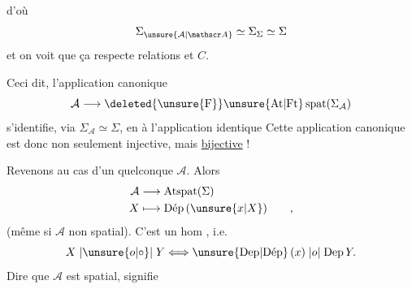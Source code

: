 d'où
\[
\Sigma_{\unsure{\mathcal A|\mathscr A}}\simeq\Sigma_{\Sigma}\simeq\Sigma
\]
et on voit que ça respecte relations  et $C$.

Ceci dit, l'application canonique
\[
\mathcal A\longrightarrow\deleted{\unsure{\mathrm F}}\unsure{\mathrm{At}|\mathrm{Ft}}\,\mathrm{spat}(\Sigma_{\mathcal A})
\]
s'identifie, via $\Sigma_{\mathcal A}\simeq\Sigma$, en 
à l'application identique Cette application canonique est donc non seulement injective, mais \uline{bijective} !

Revenons au cas d'un   quelconque $\mathcal A$.  Alors 
\[
\begin{aligned}
\mathcal A&\longrightarrow\mathrm{Atspat}(\Sigma)\\
X&\longmapsto\text{Dép}\,(\unsure{x|X})\qquad ,
\end{aligned}
\]
(même si  $\mathcal A$ non spatial). C'est un hom \uline{}, i.e.
\[
X\mathrel{|\unsure{o|\circ}|}Y\Longleftrightarrow\text{\unsure{Dep|Dép}}\,(x)\mathrel{|o|}\text{Dep}\,Y.
\]
Dire que $\mathcal A$ est spatial, signifie
